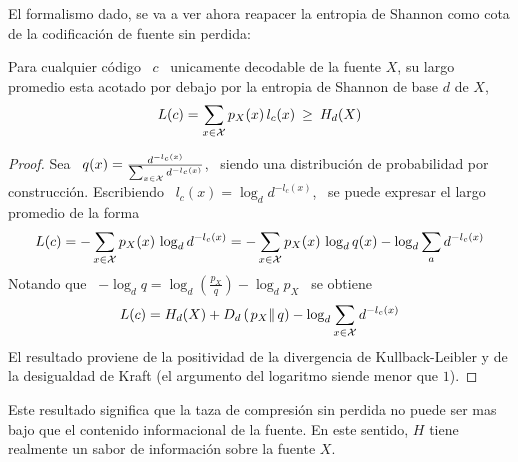 El formalismo dado, se va a ver  ahora reapacer la entropia de Shannon como cota
de la codificaci\'on de fuente sin perdida:

\begin{teorema}
  Para cualquier  c\'odigo \  $c$ \  unicamente decodable de  la fuente  $X$, su
  largo promedio esta acotado por debajo  por la entropia de Shannon de base $d$
  de $X$,
  \[
  L(c) = \sum_{x \in \mathcal{X}} p_X(x) \, l_c(x) \: \ge \: H_d(X)
  \]
\end{teorema}
%
\begin{proof}
  Sea \ $q(x)  = \frac{d^{-l_c(x)}}{\sum_{x \in \mathcal{X}} d^{-l_c(x)}}$,  \ siendo una
  distribuci\'on de  probabilidad por  construcci\'on.  Escribiendo \  $l_c(x) =
  \log_d d^{-l_c(x)}$, \ se puede expresar el largo promedio de la forma
  \[
  L(c) =  - \sum_{x  \in \mathcal{X}}  p_X(x) \, \log_d  d^{-l_c(x)} =  - \sum_{x  \in \mathcal{X}}
  p_X(x) \, \log_d q(x) - \log_d \sum_a d^{-l_c(x)}
  \]
  Notando que \ $- \log_d q  = \log_d \left( \frac{p_X}{q} \right) - \log_d p_X$
  \ se obtiene
  \[
  L(c) = H_d(X)  + D_d\left( \left.  p_X \right\| q \right)  - \log_d \sum_{x \in
    \mathcal{X}} d^{-l_c(x)}
  \]
  El resultado proviene de la  positividad de la divergencia de Kullback-Leibler
  y de  la desigualdad  de Kraft  (el argumento del  logaritmo siende  menor que
  $1$).
\end{proof}
%
\noindent Este  resultado significa que la  taza de compresi\'on  sin perdida no
puede ser mas bajo que el contenido informacional de la fuente. En este sentido,
$H$ tiene realmente un sabor de informaci\'on sobre la fuente $X$.

